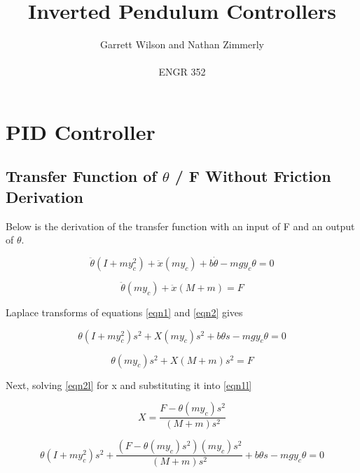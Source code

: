 \documentclass{article}
\begin{document}
\title{Inverted Pendulum Controllers}
\author{Garrett Wilson and Nathan Zimmerly \\ \\
ENGR 352}
\maketitle

\clearpage
\tableofcontents
\pagebreak

\section{PID Controller}
\subsection{Transfer Function of $\theta$ / F Without Friction Derivation}
Below is the derivation of the transfer function with an input of F and an output of $\theta$.


\begin{equation} 
\label{eqn1}
\ddot \theta (I+m y_c^2)+\ddot x (m y_c)+b \dot \theta - m g y_c \theta = 0 
\end{equation}


\begin{equation} 
\label{eqn2}
\ddot \theta(m y_c) + \ddot x(M+m) = F
\end{equation}

Laplace transforms of equations \ref{eqn1} and \ref{eqn2} gives

\begin{equation} 
\label{eqn1l}
\theta (I+m y_c^2) s^2+ X (m y_c) s^2+b \theta s - m g y_c \theta = 0 
\end{equation}


\begin{equation}  
\label{eqn2l}
\theta (m y_c) s^2+ X (M+m) s^2= F
\end{equation}

Next, solving \ref{eqn2l} for x and substituting it into \ref{eqn1l}

\begin{equation}  
\label{eqn2lb}
X = \frac{F - \theta (m y_c) s^2}{(M+m) s^2}
\end{equation}

\begin{equation} 
\label{eqn3}
\theta (I+m y_c^2) s^2+ \frac{(F - \theta (m y_c) s^2)(m y_c) s^2}{(M+m) s^2} + b \theta s - m g y_c \theta = 0 
\end{equation}
\end{document}
